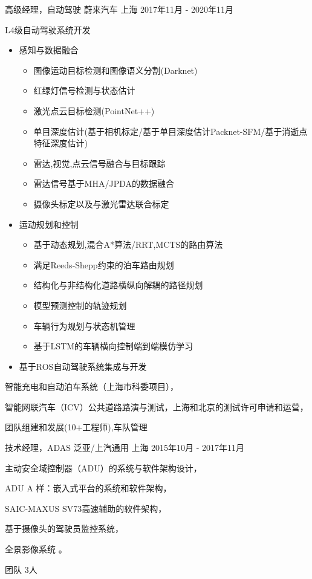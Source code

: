\documentclass[../cv_cn.tex]{subfiles}
\begin{document}
\begin{cventries}
	\cventry
	{高级经理，自动驾驶} %
	{蔚来汽车} %
	{上海} %
	{2017年11月 - 2020年11月} %
	{
		\begin{cvitems}
			\item L4级自动驾驶系统开发
			\begin{itemize}
				\item 感知与数据融合
				  \begin{itemize}
					\item 图像运动目标检测和图像语义分割(Darknet)
					\item 红绿灯信号检测与状态估计
					\item 激光点云目标检测(PointNet++)
					\item 单目深度估计(基于相机标定/基于单目深度估计Packnet-SFM/基于消逝点特征深度估计)
					\item 雷达,视觉,点云信号融合与目标跟踪
					\item 雷达信号基于MHA/JPDA的数据融合
					\item 摄像头标定以及与激光雷达联合标定
				  \end{itemize}
				\item 运动规划和控制
				  \begin{itemize}
				  	\item 基于动态规划,混合A*算法/RRT,MCTS的路由算法
					\item 满足Reeds-Shepp约束的泊车路由规划
					\item 结构化与非结构化道路横纵向解耦的路径规划
					\item 模型预测控制的轨迹规划
					\item 车辆行为规划与状态机管理
					\item 基于LSTM的车辆横向控制端到端模仿学习
				  \end{itemize}
				\item 基于ROS自动驾驶系统集成与开发
			\end{itemize}
			\item 智能充电和自动泊车系统（上海市科委项目），
			\item 智能网联汽车（ICV）公共道路路演与测试，上海和北京的测试许可申请和运营，
			\item 团队组建和发展(10+工程师),车队管理
		\end{cvitems}
	}

	\cventry
	{技术经理，ADAS} %
	{泛亚/上汽通用} %
	{上海} %
	{2015年10月 - 2017年11月} %
	{
		\begin{cvitems}
			\item 主动安全域控制器（ADU）的系统与软件架构设计，
			\item ADU A 样：嵌入式平台的系统和软件架构，
			\item SAIC-MAXUS SV73高速辅助的软件架构，
			\item 基于摄像头的驾驶员监控系统，
			\item 全景影像系统 \supercite{Xin_RearView_17}。
			\item 团队 3人
		\end{cvitems}
	}



\end{cventries}
\end{document}
